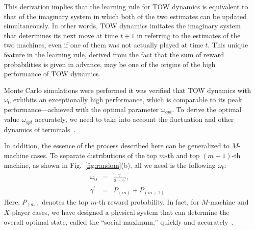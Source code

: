 \documentclass[twocolumn,showpacs,preprintnumbers,amsmath,amssymb]{revtex4}
\begin{document}
This derivation implies that the learning rule for TOW dynamics is equivalent to that of the imaginary system in which both of the two estimates can be updated simultaneously.
In other words, TOW dynamics imitates the imaginary system that determines its next move at time $t+1$ in referring to the estimates of the two machines, even if one of them was not actually played at time $t$. 
This unique feature in the learning rule, derived from the fact that the sum of reward probabilities is given in advance, may be one of the origins of the high performance of TOW dynamics.

Monte Carlo simulations were performed it was verified that TOW dynamics with $\omega_0$ exhibits an exceptionally high performance, which is comparable to its peak performance---achieved with the optimal parameter $\omega_{opt}$.
To derive the optimal value $\omega_{opt}$ accurately, we need to take into account the fluctuation and other dynamics of terminals~\cite{kim4}.

In addition, the essence of the process described here can be generalized to $M$-machine cases.
To separate distributions of the top $m$-th and top $(m+1)$-th machine, as shown in Fig.~\ref{fig:random}(b), all we need is the following $\omega_0$:
\begin{eqnarray}
\omega_0  & = & \frac{\gamma^{\prime}}{2 - \gamma^{\prime}} , \\
\gamma^{\prime} & = & P_{(m)} + P_{(m+1)}
\end{eqnarray} 
Here, $P_{(m)}$ denotes the top $m$-th reward probability.
In fact, for $M$-machine and $X$-player cases, we have designed a physical system that can  determine the overall optimal state, called the ``social maximum,'' quickly and accurately~\cite{bom}.


\end{document}
